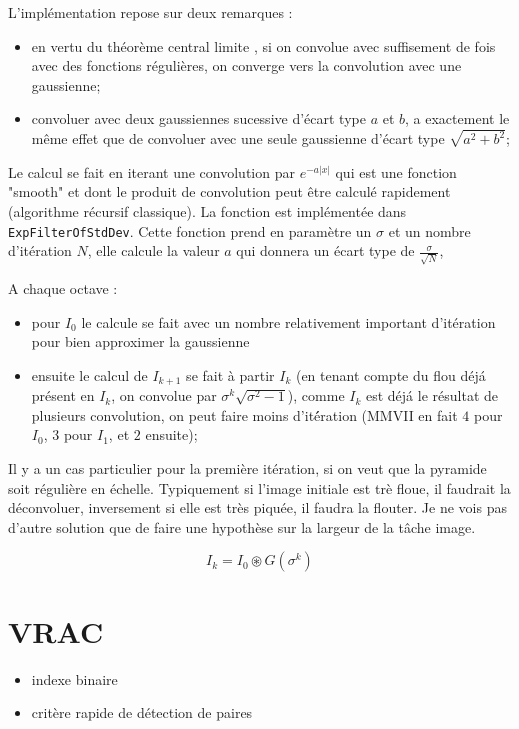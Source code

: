 L'impl\'ementation repose sur deux remarques :

\begin{itemize}
    \item en vertu du th\'eor\`eme central limite , si on convolue avec suffisement de fois avec des fonctions r\'eguli\`eres,
          on converge vers la convolution avec une gaussienne;
    \item convoluer avec deux gaussiennes sucessive d'\'ecart type $a$ et $b$, a exactement le même effet que
          de convoluer avec une seule gaussienne d'\'ecart type $\sqrt{a^2+b^2}$;
  
\end{itemize}

Le calcul se fait en iterant une convolution par $e^{-a|x|}$ qui est une fonction 
"smooth" et dont le produit de convolution peut \^etre calcul\'e rapidement (algorithme r\'ecursif classique).
La fonction est impl\'ement\'ee dans {\tt ExpFilterOfStdDev}.  Cette fonction prend
en param\`etre un $\sigma$ et un nombre d'it\'eration $N$, elle calcule la valeur
$a$ qui donnera un \'ecart type de $\frac{\sigma}{\sqrt{N}}$,

A chaque octave  :

\begin{itemize}
   \item  pour $I_0$ le calcule se fait avec un nombre relativement important d'it\'eration pour
          bien approximer la gaussienne

   \item  ensuite le calcul de $I_{k+1}$ se fait \`a partir $I_k$ (en tenant compte du flou d\'ej\'a pr\'esent
          en $I_k$, on convolue par $\sigma^k \sqrt{\sigma^2-1}$), comme $I_k$ est d\'ej\'a le r\'esultat de plusieurs
          convolution, on peut faire moins d'it\'ération (MMVII en fait $4$ pour $I_0$, $3$ pour $I_1$, et $2$ ensuite);
\end{itemize}

Il y a un cas particulier pour la premi\`ere it\'eration, si on veut que la pyramide soit r\'eguli\`ere en \'echelle.
Typiquement si l'image initiale est tr\`e floue, il faudrait la d\'econvoluer, inversement si elle est tr\`es piqu\'ee,
il faudra la flouter.  Je ne vois pas d'autre solution que de faire une hypothèse sur la largeur de la t\^ache image.





\begin{equation}
     I_k = I_0  \circledast G(\sigma^k)
\end{equation}


\section{VRAC}

\begin{itemize}
   \item indexe binaire
    \item crit\`ere rapide de d\'etection de paires
\end{itemize}

